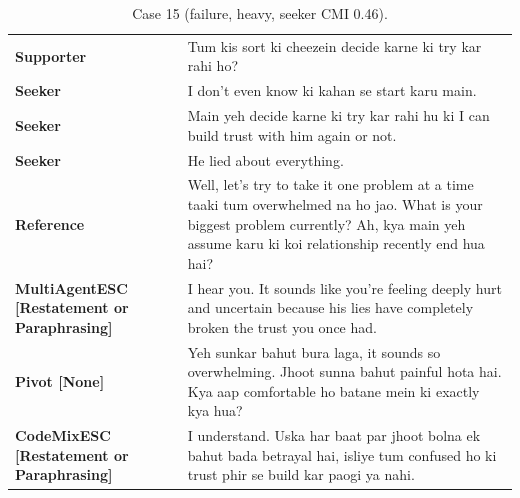 \begin{table}[t]
\centering\footnotesize
\caption{Case 15 (failure, heavy, seeker CMI 0.46).}
\label{tab:case15}
\begin{tabular}{@{}p{}p{}@{}}
\toprule
\textbf{Supporter} & Tum kis sort ki cheezein decide karne ki try kar rahi ho? \\
\textbf{Seeker} & I don't even know ki kahan se start karu main. \\
\textbf{Seeker} & Main yeh decide karne ki try kar rahi hu ki I can build trust with him again or not. \\
\textbf{Seeker} & He lied about everything. \\
\textbf{Reference} & Well, let's try to take it one problem at a time taaki tum overwhelmed na ho jao. What is your biggest problem currently? Ah, kya main yeh assume karu ki koi relationship recently end hua hai? \\
\textbf{MultiAgentESC [Restatement or Paraphrasing]} & I hear you. It sounds like you're feeling deeply hurt and uncertain because his lies have completely broken the trust you once had. \\
\textbf{Pivot [None]} & Yeh sunkar bahut bura laga, it sounds so overwhelming. Jhoot sunna bahut painful hota hai. Kya aap comfortable ho batane mein ki exactly kya hua? \\
\textbf{CodeMixESC [Restatement or Paraphrasing]} & I understand. Uska har baat par jhoot bolna ek bahut bada betrayal hai, isliye tum confused ho ki trust phir se build kar paogi ya nahi. \\
\bottomrule
\end{tabular}
\end{table}

